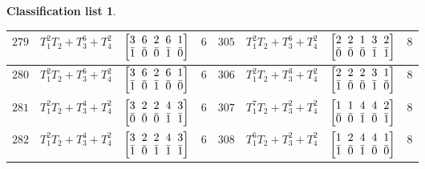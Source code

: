 \documentclass[pdftex]{sigma}%
\theoremstyle{definition}
\newtheorem{class-list}[thm]{Classification list}
\numberwithin{equation}{section}
\begin{document}
\begin{class-list}
\begin{table}[h!]
\begin{tabu}{c|c|c|c||c|c|c|c}
\\
\hline
${279}$&${T_{1}^{2}T_{2}+T_{3}^{6}+T_{4}^{2}}$
&$\arraycolsep=1mm\begin{bmatrix}{3} & {6} & {2} & {6} & {1} \\ {\bar{1}} & {\bar{0}} & {\bar{0}} & {\bar{1}} & {\bar{0}}\end{bmatrix}$&${6}$
&${305}$&${T_{1}^{2}T_{2}+T_{3}^{6}+T_{4}^{2}}$
&$\arraycolsep=1mm\begin{bmatrix}{2} & {2} & {1} & {3} & {2} \\ {\bar{0}} & {\bar{0}} & {\bar{0}} & {\bar{1}} & {\bar{1}}\end{bmatrix}$&${8}$
\\
\hline
${280}$&${T_{1}^{2}T_{2}+T_{3}^{6}+T_{4}^{2}}$
&$\arraycolsep=1mm\begin{bmatrix}{3} & {6} & {2} & {6} & {1} \\ {\bar{1}} & {\bar{0}} & {\bar{1}} & {\bar{0}} & {\bar{0}}\end{bmatrix}$&${6}$
&${306}$&${T_{1}^{2}T_{2}+T_{3}^{3}+T_{4}^{2}}$
&$\arraycolsep=1mm\begin{bmatrix}{2} & {2} & {2} & {3} & {1} \\ {\bar{1}} & {\bar{0}} & {\bar{0}} & {\bar{1}} & {\bar{0}}\end{bmatrix}$&${8}$
\\
\hline
${281}$&${T_{1}^{2}T_{2}+T_{3}^{4}+T_{4}^{2}}$
&$\arraycolsep=1mm\begin{bmatrix}{3} & {2} & {2} & {4} & {3} \\ {\bar{0}} & {\bar{0}} & {\bar{0}} & {\bar{1}} & {\bar{1}}\end{bmatrix}$&${6}$
&${307}$&${T_{1}^{7}T_{2}+T_{3}^{2}+T_{4}^{2}}$
&$\arraycolsep=1mm\begin{bmatrix}{1} & {1} & {4} & {4} & {2} \\ {\bar{0}} & {\bar{0}} & {\bar{1}} & {\bar{0}} & {\bar{1}}\end{bmatrix}$&${8}$
\\
\hline
${282}$&${T_{1}^{2}T_{2}+T_{3}^{4}+T_{4}^{2}}$
&$\arraycolsep=1mm\begin{bmatrix}{3} & {2} & {2} & {4} & {3} \\ {\bar{1}} & {\bar{0}} & {\bar{1}} & {\bar{1}} & {\bar{1}}\end{bmatrix}$&${6}$
&${308}$&${T_{1}^{6}T_{2}+T_{3}^{2}+T_{4}^{2}}$
&$\arraycolsep=1mm\begin{bmatrix}{1} & {2} & {4} & {4} & {1} \\ {\bar{1}} & {\bar{0}} & {\bar{1}} & {\bar{0}} & {\bar{0}}\end{bmatrix}$&${8}$

\end{tabu}
\end{table}
\end{class-list}
\end{document}
